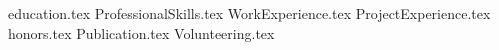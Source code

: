 \documentclass[11pt, a4paper]{awesome-cv}
\newcommand*{\sectiondir}{resume/}
\begin{document}
\makecvheader

{education.tex}
{ProfessionalSkills.tex}
{WorkExperience.tex}
{ProjectExperience.tex}
{honors.tex}
{Publication.tex}
{Volunteering.tex}
\end{document}
